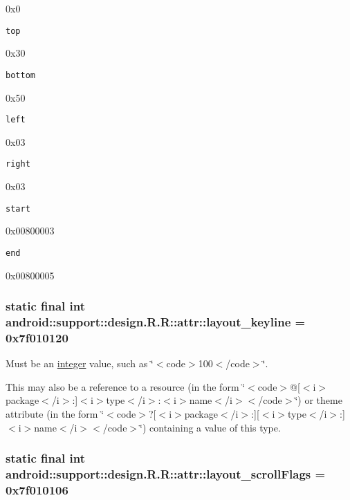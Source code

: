 0x0

{\tt top}

0x30

{\tt bottom}

0x50

{\tt left}

0x03

{\tt right}

0x03

{\tt start}

0x00800003

{\tt end}

0x00800005\hypertarget{classandroid_1_1support_1_1design_1_1_r_1_1attr_7a4a2a9de0c0caf84e2d895519cbf0e4}{
\subsubsection[{layout\_\-keyline}]{\setlength{\rightskip}{0pt plus 5cm}static final int android::support::design.R.R::attr::layout\_\-keyline = 0x7f010120}}
\label{classandroid_1_1support_1_1design_1_1_r_1_1attr_7a4a2a9de0c0caf84e2d895519cbf0e4}


Must be an \hyperlink{classandroid_1_1support_1_1design_1_1_r_1_1integer}{integer} value, such as \char`\"{}$<$code$>$100$<$/code$>$\char`\"{}. 

This may also be a reference to a resource (in the form \char`\"{}$<$code$>$@\mbox{[}$<$i$>$package$<$/i$>$:\mbox{]}$<$i$>$type$<$/i$>$:$<$i$>$name$<$/i$>$$<$/code$>$\char`\"{}) or theme attribute (in the form \char`\"{}$<$code$>$?\mbox{[}$<$i$>$package$<$/i$>$:\mbox{]}\mbox{[}$<$i$>$type$<$/i$>$:\mbox{]}$<$i$>$name$<$/i$>$$<$/code$>$\char`\"{}) containing a value of this type. \hypertarget{classandroid_1_1support_1_1design_1_1_r_1_1attr_f72bd4a4e640614ddf33846a32db7c59}{
\subsubsection[{layout\_\-scrollFlags}]{\setlength{\rightskip}{0pt plus 5cm}static final int android::support::design.R.R::attr::layout\_\-scrollFlags = 0x7f010106}}
\label{classandroid_1_1support_1_1design_1_1_r_1_1attr_f72bd4a4e640614ddf33846a32db7c59}


